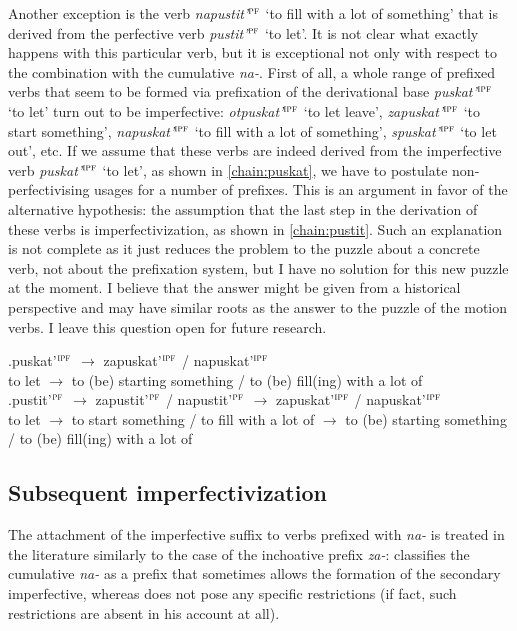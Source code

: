 Another exception is the verb \textit{napustit'}$^{\textsc{pf}}$ `to fill with a lot of something' that is derived from the perfective verb \textit{pustit'}$^{\textsc{pf}}$ `to let'. It is not clear what exactly happens with this particular verb, but it is exceptional not only with respect to the combination with the cumulative \textit{na-}. First of all, a whole range of prefixed verbs that seem to be formed via prefixation of the derivational base \textit{puskat'}$^{\textsc{ipf}}$ `to let' turn out to be imperfective: \textit{otpuskat'}$^{\textsc{ipf}}$ `to let leave', \textit{zapuskat'}$^{\textsc{ipf}}$ `to start something', \textit{napuskat'}$^{\textsc{ipf}}$ `to fill with a lot of something', \textit{spuskat'}$^{\textsc{ipf}}$ `to let out', etc. If we assume that these verbs are indeed derived from the imperfective verb \textit{puskat'}$^{\textsc{ipf}}$ `to let', as shown in \ref{chain:puskat}, we have to postulate non-perfectivising usages for a number of prefixes. This is an argument in favor of the alternative hypothesis: the assumption that the last step in the derivation of these verbs is imperfectivization, as shown in \ref{chain:pustit}. Such an explanation is not complete as it just reduces the problem to the puzzle about a concrete verb, not about the prefixation system, but I have no solution for this new puzzle at the moment. I believe that the answer might be given from a historical perspective and may have similar roots as the answer to the puzzle of the motion verbs. I leave this question open for future research.

\exg.puskat'$^{\textsc{ipf}}$ $\rightarrow$ zapuskat'$^{\textsc{ipf}}$ / napuskat'$^{\textsc{ipf}}$ \label{chain:puskat}\\
{to let} $\rightarrow$ {to (be) starting something} / {to (be) fill(ing) with a lot of}\\

\exg.pustit'$^{\textsc{pf}}$ $\rightarrow$ zapustit'$^{\textsc{pf}}$ / napustit'$^{\textsc{pf}}$ $\rightarrow$ zapuskat'$^{\textsc{ipf}}$ / napuskat'$^{\textsc{ipf}}$ \label{chain:pustit}\\
{to let} $\rightarrow$ {to start something} / {to fill with a lot of} $\rightarrow$ {to (be) starting something} / {to (be) fill(ing) with a lot of}\\

\subsection{Subsequent imperfectivization}
The attachment of the imperfective suffix to verbs prefixed with \textit{na-} is treated in the literature similarly to the case of the inchoative prefix \textit{za-}: \citet[230]{Svenonius:04b} classifies the cumulative \textit{na-} as a prefix that sometimes allows the formation of the secondary imperfective, whereas \citet{Tatevosov:09} does not pose any specific restrictions (if fact, such restrictions are absent in his account at all).

